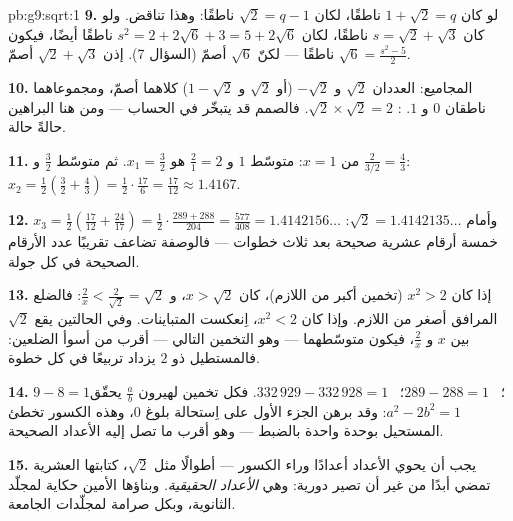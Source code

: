\begin{solution}{pb:g9:sqrt:1}
\textbf{9.} لو كان $1 + \sqrt2 = q$ ناطقًا، لكان
$\sqrt2 = q - 1$ ناطقًا: وهذا تناقض. ولو كان
$s = \sqrt2 + \sqrt3$ ناطقًا، لكان
$s^2 = 2 + 2\sqrt6 + 3 = 5 + 2\sqrt6$ ناطقًا أيضًا، فيكون
$\sqrt6 = \frac{s^2 - 5}{2}$ ناطقًا --- لكنّ $\sqrt6$ أصمّ
(السؤال 7). إذن $\sqrt2 + \sqrt3$ أصمّ.

\textbf{10.} المجاميع: العددان $\sqrt2$ و $-\sqrt2$ (أو $\sqrt2$
و $1 - \sqrt2$) كلاهما أصمّ، ومجموعاهما ناطقان $0$ و $1$.
: $\sqrt2 \times \sqrt2 = 2$. فالصمم قد يتبخّر في
الحساب --- ومن هنا البراهين حالةً حالة.

\textbf{11.} من $x = 1$: متوسّط $1$ و $\frac21 = 2$ هو
$x_1 = \frac32$. ثم متوسّط $\frac32$ و
$\frac{2}{3/2} = \frac43$:
$x_2 = \frac12\left(\frac32 + \frac43\right)
= \frac12 \cdot \frac{17}{6} = \frac{17}{12} \approx 1.4167$.

\textbf{12.} $x_3 = \frac12\left(\frac{17}{12} +
\frac{24}{17}\right) = \frac12 \cdot
\frac{289 + 288}{204} = \frac{577}{408} = 1.4142156\ldots$
وأمام $\sqrt2 = 1.4142135\ldots$: خمسة أرقام عشرية صحيحة بعد ثلاث
خطوات --- فالوصفة تضاعف تقريبًا عدد الأرقام الصحيحة في كل
جولة.

\textbf{13.} إذا كان $x^2 > 2$ (تخمين أكبر من اللازم)، كان
$x > \sqrt2$، و $\frac2x < \frac{2}{\sqrt2} = \sqrt2$: فالضلع
المرافق أصغر من اللازم. وإذا كان $x^2 < 2$، اِنعكست المتباينات.
وفي الحالتين يقع $\sqrt2$ بين $x$ و $\frac2x$، فيكون متوسّطهما ---
وهو التخمين التالي --- أقرب من أسوأ الضلعين: فالمستطيل
ذو  $2$ يزداد تربيعًا في كل خطوة.

\textbf{14.} $9 - 8 = 1$؛ \ $289 - 288 = 1$؛ \
$332\,929 - 332\,928 = 1$. فكل تخمين لهيرون $\frac ab$ يحقّق
$a^2 - 2b^2 = 1$: وقد برهن الجزء الأول على اِستحالة بلوغ $0$،
وهذه الكسور تخطئ المستحيل بوحدة واحدة بالضبط --- وهو أقرب ما
تصل إليه الأعداد الصحيحة.

\textbf{15.} يجب أن يحوي  الأعداد أعدادًا وراء الكسور ---
أطوالًا مثل $\sqrt2$، كتابتها العشرية تمضي أبدًا من غير أن تصير
دورية: وهي \emph{الأعداد الحقيقية}. وبناؤها الأمين حكاية لمجلّد
الثانوية، وبكل صرامة لمجلّدات الجامعة.
\end{solution}
